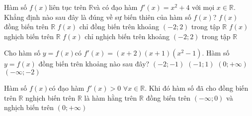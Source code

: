 \begin{ex}%
	Hàm số $ f(x)$liên tục trên $\mathbb{R}$và có đạo hàm $f'(x)=x^2+4$ với mọi $x\in \mathbb{R}$. Khẳng định nào sau đây là đúng về sự biến thiên của hàm số $f(x)$?
	\choice
	{\True $f(x)$ đồng biến trên $\mathbb{R}$}
	{$f(x)$ chỉ đồng biến trên khoảng $\left(-2; 2\right)$ trong tập $\mathbb{R}$}
	{$f(x)$ nghịch biến trên $\mathbb{R}$}
	{$ f(x)$ chỉ nghịch biến trên khoảng $\left(-2; 2\right)$ trong tập $\mathbb{R}$}
\end{ex}

\begin{ex}%
	Cho hàm số $ y=f(x)$có $f'(x)=\left(x+2\right)\left(x+1\right)\left(x^2-1\right)$. Hàm số $y=f(x)$ đồng biến trên khoảng nào sau đây?
	\choice
	{$\left(-2; -1\right)$}
	{$\left(-1; 1\right)$}
	{\True $\left(0; +\infty\right)$}
	{$\left(-\infty; -2\right)$}
\end{ex}

\begin{ex}%
	Hàm số $f(x)$có đạo hàm $f'(x)>0\,\, \forall x\in \mathbb{R}$. Khi đó hàm số đã cho
	\choice
	{\True đồng biến trên $\mathbb{R}$}
	{nghịch biến trên $\mathbb{R}$}
	{là hàm hằng trên $\mathbb{R}$}
	{đồng biến trên $\left(-\infty; 0\right)$ và nghịch biến trên $\left(0; +\infty\right)$}
\end{ex}

